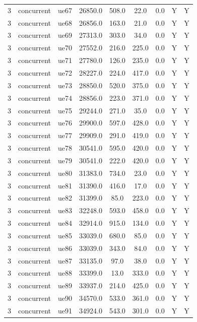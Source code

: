\begin{table}[ht]
\begin{tabular}{|c|c|c|c|c|c|c|c|c|}
3 & concurrent & ue67 & 26850.0 & 508.0 & 22.0 & 0.0 & Y & Y \\
3 & concurrent & ue68 & 26856.0 & 163.0 & 21.0 & 0.0 & Y & Y \\
3 & concurrent & ue69 & 27313.0 & 303.0 & 34.0 & 0.0 & Y & Y \\
3 & concurrent & ue70 & 27552.0 & 216.0 & 225.0 & 0.0 & Y & Y \\
3 & concurrent & ue71 & 27780.0 & 126.0 & 235.0 & 0.0 & Y & Y \\
3 & concurrent & ue72 & 28227.0 & 224.0 & 417.0 & 0.0 & Y & Y \\
3 & concurrent & ue73 & 28850.0 & 520.0 & 375.0 & 0.0 & Y & Y \\
3 & concurrent & ue74 & 28856.0 & 223.0 & 371.0 & 0.0 & Y & Y \\
3 & concurrent & ue75 & 29244.0 & 271.0 & 35.0 & 0.0 & Y & Y \\
3 & concurrent & ue76 & 29900.0 & 597.0 & 428.0 & 0.0 & Y & Y \\
3 & concurrent & ue77 & 29909.0 & 291.0 & 419.0 & 0.0 & Y & Y \\
3 & concurrent & ue78 & 30541.0 & 595.0 & 420.0 & 0.0 & Y & Y \\
3 & concurrent & ue79 & 30541.0 & 222.0 & 420.0 & 0.0 & Y & Y \\
3 & concurrent & ue80 & 31383.0 & 734.0 & 23.0 & 0.0 & Y & Y \\
3 & concurrent & ue81 & 31390.0 & 416.0 & 17.0 & 0.0 & Y & Y \\
3 & concurrent & ue82 & 31399.0 & 85.0 & 223.0 & 0.0 & Y & Y \\
3 & concurrent & ue83 & 32248.0 & 593.0 & 458.0 & 0.0 & Y & Y \\
3 & concurrent & ue84 & 32914.0 & 915.0 & 134.0 & 0.0 & Y & Y \\
3 & concurrent & ue85 & 33039.0 & 680.0 & 85.0 & 0.0 & Y & Y \\
3 & concurrent & ue86 & 33039.0 & 343.0 & 84.0 & 0.0 & Y & Y \\
3 & concurrent & ue87 & 33135.0 & 97.0 & 38.0 & 0.0 & Y & Y \\
3 & concurrent & ue88 & 33399.0 & 13.0 & 333.0 & 0.0 & Y & Y \\
3 & concurrent & ue89 & 33937.0 & 214.0 & 425.0 & 0.0 & Y & Y \\
3 & concurrent & ue90 & 34570.0 & 533.0 & 361.0 & 0.0 & Y & Y \\
3 & concurrent & ue91 & 34924.0 & 543.0 & 301.0 & 0.0 & Y & Y \\

\end{tabular}
\end{table}
